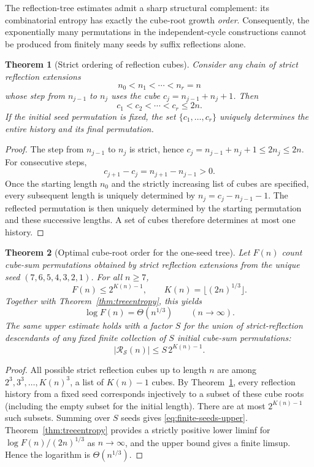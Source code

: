 \documentclass[10pt]{article}
\newtheorem{theorem}{Theorem}
\begin{document}
The reflection-tree estimates admit a sharp
structural complement: its combinatorial entropy
has exactly the cube-root growth \emph{order}.
Consequently, the exponentially many
permutations in the independent-cycle constructions
cannot be produced from finitely many seeds by
suffix reflections alone.

\begin{theorem}[Strict ordering of reflection cubes]
\label{thm:cube-order}
Consider any chain of strict reflection extensions
\[
n_0<n_1<\cdots<n_r=n
\]
whose step from $n_{j-1}$ to $n_j$
uses the cube $c_j=n_{j-1}+n_j+1$.
Then
\[
\boxed{c_1<c_2<\cdots<c_r\le2n.}
\]
If the initial seed permutation is fixed,
the set $\{c_1,\ldots,c_r\}$ uniquely
determines the entire history and its
final permutation.
\end{theorem}
\begin{proof}
The step from $n_{j-1}$ to $n_j$
is strict, hence
$c_j=n_{j-1}+n_j+1\le2n_j\le2n$.
For consecutive steps,
\[
c_{j+1}-c_j
=n_{j+1}-n_{j-1}>0.
\]
Once the starting length $n_0$ and
the strictly increasing list of cubes
are specified, every subsequent
length is uniquely determined by
$n_j=c_j-n_{j-1}-1$.
The reflected permutation is then
uniquely determined by the starting
permutation and these successive
lengths. A set of cubes therefore
determines at most one history.
\end{proof}

\begin{theorem}[Optimal cube-root order for the one-seed tree]
\label{thm:reflection-barrier}
Let $F(n)$ count cube-sum permutations
obtained by strict reflection extensions
from the unique seed
$(7,6,5,4,3,2,1)$.
For all $n\ge7$,
\begin{equation}\label{eq:reflection-upper}
\boxed{\displaystyle
F(n)\le 2^{K(n)-1},
\qquad K(n)=\lfloor(2n)^{1/3}\rfloor.}
\end{equation}
Together with
Theorem~\ref{thm:treeentropy}, this yields
\[
\boxed{\displaystyle
\log F(n)=\Theta(n^{1/3})\qquad(n\to\infty).}
\]
The same upper estimate holds with a
factor $S$ for the union of strict-reflection
descendants of any fixed finite collection
of $S$ initial cube-sum permutations:
\begin{equation}\label{eq:finite-seeds-upper}
\boxed{\displaystyle
|\mathcal R_{\mathcal S}(n)|
\le S\,2^{K(n)-1}.}
\end{equation}
\end{theorem}
\begin{proof}
All possible strict reflection cubes up to
length $n$ are among
$2^3,3^3,\ldots,K(n)^3$,
a list of $K(n)-1$ cubes.
By Theorem~\ref{thm:cube-order},
every reflection history from a fixed
seed corresponds injectively to a subset
of these cube roots (including the empty
subset for the initial length).
There are at most $2^{K(n)-1}$ such
subsets. Summing over $S$ seeds gives
\eqref{eq:finite-seeds-upper}.
Theorem~\ref{thm:treeentropy} provides a
strictly positive lower liminf for
$\log F(n)/(2n)^{1/3}$ as $n\to\infty$,
and the upper bound gives a finite
limsup. Hence the logarithm is
$\Theta(n^{1/3})$.
\end{proof}
\end{document}
